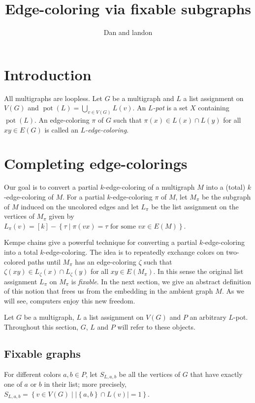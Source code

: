 \documentclass[12pt]{article}
\theoremstyle{plain}
\theoremstyle{definition}
\theoremstyle{remark}
\newcommand{\set}[1]{\left\{ #1 \right\}}
\newcommand{\setb}[3]{\left\{ #1 \in #2 \mid #3 \right\}}
\newcommand{\setbs}[2]{\left\{ #1 \mid #2 \right\}}
\newcommand{\card}[1]{\left|#1\right|}
\newcommand{\irange}[1]{\left[#1\right]}
\newcommand{\pot}{\operatorname{pot}}
\begin{document}
\title{Edge-coloring via fixable subgraphs}
\author{Dan and landon}
\maketitle

\section{Introduction}
All multigraphs are loopless.  Let $G$ be a multigraph and $L$ a list assignment on $V(G)$ and $\pot(L) = \bigcup_{v\in V(G)} L(v)$. An \emph{$L$-pot} is a set $X$ containing $\pot(L)$. 
An edge-coloring $\pi$ of $G$ such that $\pi(x) \in L(x) \cap L(y)$ for all $xy \in E(G)$ is called an \emph{$L$-edge-coloring}.

\section{Completing edge-colorings}
Our goal is to convert a partial $k$-edge-coloring of a multigraph $M$ into a (total) $k$-edge-coloring of $M$.  For a partial $k$-edge-coloring $\pi$ of $M$, let $M_\pi$ be the subgraph of $M$ induced on the uncolored edges and let $L_\pi$ be the list assignment on the vertices of $M_\pi$ given by 
$L_\pi(v) = \irange{k} - \setbs{\tau}{\pi(vx) = \tau \text{ for some  } vx \in E(M)}$. 

Kempe chains give a powerful technique for converting a partial $k$-edge-coloring into a total $k$-edge-coloring.  The idea is to repeatedly exchange colors on two-colored paths until $M_\pi$ has an edge-coloring $\zeta$ such that $\zeta(xy) \in L_\zeta(x) \cap L_\zeta(y)$ for all $xy \in E(M_\pi)$.  In this sense the original list assignment $L_\pi$ on $M_\pi$ is \emph{fixable}. In the next section, we give an abstract definition of this notion that frees us from the embedding in the ambient graph $M$.  As we will see, computers enjoy this new freedom.

Let $G$ be a multigraph, $L$ a list assignment on $V(G)$ and $P$ an arbitrary $L$-pot.  Throughout this section, $G$, $L$ and $P$ will refer to these objects.

\subsection{Fixable graphs}

For different colors $a,b \in P$, let $S_{L,a,b}$ be all the vertices of $G$ that have exactly one of $a$ or $b$ in their list; more precisely, $S_{L,a,b} = \setb{v}{V(G)}{\card{\set{a,b} \cap L(v)} = 1}$.  
\end{document}
